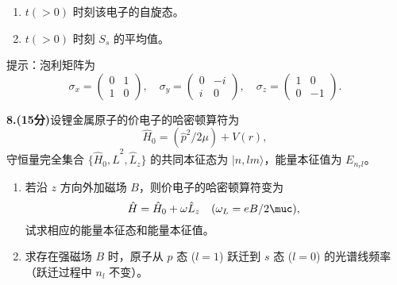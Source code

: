 \begin{enumerate}
    \item $t(>0)$ 时刻该电子的自旋态。
    \item $t(>0)$ 时刻 $S_s$ 的平均值。
\end{enumerate}

提示：泡利矩阵为
\[
\sigma_x = \begin{pmatrix}
0 & 1 \\
1 & 0
\end{pmatrix}, \quad
\sigma_y = \begin{pmatrix}
0 & -i \\
i & 0
\end{pmatrix}, \quad
\sigma_z = \begin{pmatrix}
1 & 0 \\
0 & -1
\end{pmatrix}.~
\]

\textbf{8.(15分)}设锂金属原子的价电子的哈密顿算符为 
\[
\hat{H}_0 = (\hat{p}^2/2\mu) + V(r),~
\]
守恒量完全集合 $\{\hat{H}_0, \hat{L}^2, \hat{L}_z\}$ 的共同本征态为 $\lvert n,l m \rangle$，能量本征值为 $E_{n_rl}$。

\begin{enumerate}
    \item 若沿 $z$ 方向外加磁场 $B$，则价电子的哈密顿算符变为 
    \[
    \hat{H} = \hat{H}_0 + \omega \hat{L}_z \quad (\omega_L = eB/2\muc),~
    \]
    试求相应的能量本征态和能量本征值。
    
    \item 求存在强磁场 $B$ 时，原子从 $p$ 态 ($l = 1$) 跃迁到 $s$ 态 ($l = 0$) 的光谱线频率（跃迁过程中 $n_l$ 不变）。
\end{enumerate}